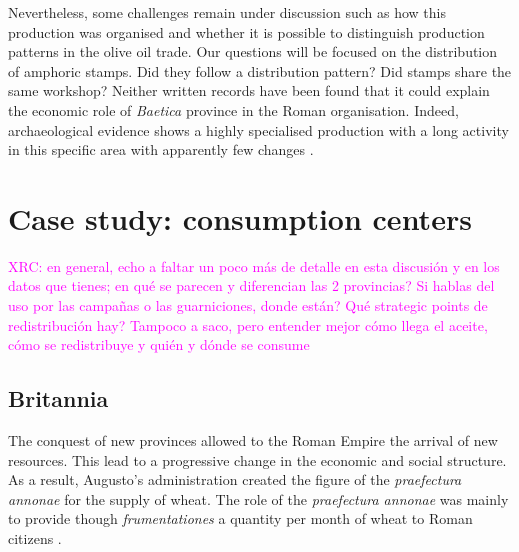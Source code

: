 \documentclass[review]{elsarticle}
\newcommand{\memo}[2]{\textcolor{#1}{#2}}
\newcommand{\xavi}[1]{\memo{magenta}{XRC: #1\\}}
\begin{document}
Nevertheless, some challenges remain under discussion such as how this production was organised and whether it is possible to distinguish production patterns in the olive oil trade. Our questions will be focused on the distribution of amphoric stamps. Did they follow a distribution pattern? Did stamps share the same workshop? Neither written records have been found that it could explain the economic role of \textit{Baetica} province in the Roman organisation. Indeed, archaeological evidence shows a highly specialised production with a long activity in this specific area with apparently few changes \citep{remesal_anforas_2004}. 








\section{Case study: consumption centers}

\xavi{en general, echo a faltar un poco más de detalle en esta discusión y en los datos que tienes; en qué se parecen y diferencian las 2 provincias? Si hablas del uso por las campañas o las guarniciones, donde están? Qué strategic points de redistribución hay? Tampoco a saco, pero entender mejor cómo llega el aceite, cómo se redistribuye y quién y dónde se consume}


\subsection{Britannia}

The conquest of new provinces allowed to the Roman Empire the arrival of new resources. This lead to a progressive change in the economic and social structure. As a result, Augusto's administration created the figure of the \textit{praefectura annonae} for the supply of wheat. The role of the \textit{praefectura annonae} was mainly to provide though \textit{frumentationes} a quantity per month of wheat to Roman citizens \citep{remesal_annona_1986,remesal_concierto}. 
\end{document}
